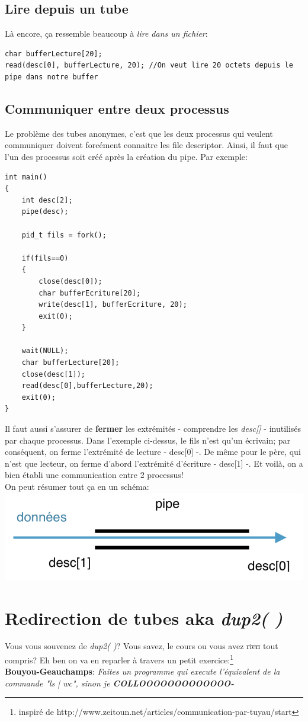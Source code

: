 \documentclass{report}
\begin{document}
\subsection{Lire depuis un tube}
Là encore, ça ressemble beaucoup à \emph{lire dans un fichier}:
\begin{verbatim}
char bufferLecture[20];
read(desc[0], bufferLecture, 20); //On veut lire 20 octets depuis le pipe dans notre buffer
\end{verbatim}

\subsection{Communiquer entre deux processus}
Le problème des tubes anonymes, c'est que les deux processus qui veulent communiquer doivent forcément connaitre les file descriptor. Ainsi, il faut que l'un des processus soit créé après la création du pipe. Par exemple:
\begin{lstlisting}
int main()
{
	int desc[2];
	pipe(desc);
	
	pid_t fils = fork();
	
	if(fils==0)
	{
		close(desc[0]);
		char bufferEcriture[20];
		write(desc[1], bufferEcriture, 20);
		exit(0);
	}
	
	wait(NULL);
	char bufferLecture[20];
	close(desc[1]);
	read(desc[0],bufferLecture,20);
	exit(0);
}
\end{lstlisting}
Il faut aussi s'assurer de \textbf{fermer} les extrémités - comprendre les \emph{desc[]} - inutilisés par chaque processus. Dans l'exemple ci-dessus, le fils n'est qu'un écrivain; par conséquent, on ferme l'extrémité de lecture - desc[0] -. De même pour le père, qui n'est que lecteur, on ferme d'abord l'extrémité d'écriture - desc[1] -.
Et voilà, on a bien établi une communication entre 2 processus!\\
On peut résumer tout ça en un schéma:\\
\includegraphics{pipe}

\section{Redirection de tubes aka \emph{dup2( )}}
Vous vous souvenez de \emph{dup2( )}? Vous savez, le cours ou vous avez \sout{rien} tout compris? Eh ben on va en reparler à travers un petit exercice:\footnote{inspiré de http://www.zeitoun.net/articles/communication-par-tuyau/start}\\
\textbf{Bouyou-Geauchamps}: \textit{Faites un programme qui execute l'équivalent de la commande "\emph{ls | wc}", sinon je \textbf{COLLOOOOOOOOOOOOO-}}\\
\end{document}
